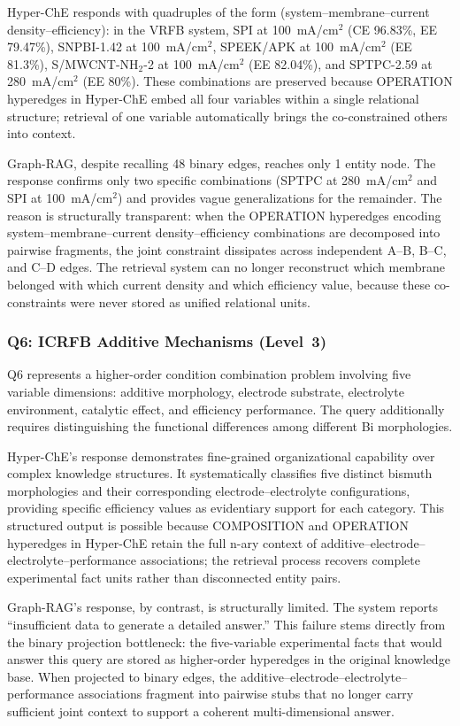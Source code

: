 Hyper-ChE responds with quadruples of the form (system--membrane--current density--efficiency): in the VRFB system, SPI at 100~mA/cm$^2$ (CE 96.83\%, EE 79.47\%), SNPBI-1.42 at 100~mA/cm$^2$, SPEEK/APK at 100~mA/cm$^2$ (EE 81.3\%), S/MWCNT-NH$_2$-2 at 100~mA/cm$^2$ (EE 82.04\%), and SPTPC-2.59 at 280~mA/cm$^2$ (EE 80\%). These combinations are preserved because OPERATION hyperedges in Hyper-ChE embed all four variables within a single relational structure; retrieval of one variable automatically brings the co-constrained others into context.

Graph-RAG, despite recalling 48 binary edges, reaches only 1 entity node. The response confirms only two specific combinations (SPTPC at 280~mA/cm$^2$ and SPI at 100~mA/cm$^2$) and provides vague generalizations for the remainder. The reason is structurally transparent: when the OPERATION hyperedges encoding system--membrane--current density--efficiency combinations are decomposed into pairwise fragments, the joint constraint dissipates across independent A--B, B--C, and C--D edges. The retrieval system can no longer reconstruct which membrane belonged with which current density and which efficiency value, because these co-constraints were never stored as unified relational units.

\subsubsection{Q6: ICRFB Additive Mechanisms (Level~3)}

Q6 represents a higher-order condition combination problem involving five variable dimensions: additive morphology, electrode substrate, electrolyte environment, catalytic effect, and efficiency performance. The query additionally requires distinguishing the functional differences among different Bi morphologies.

Hyper-ChE's response demonstrates fine-grained organizational capability over complex knowledge structures. It systematically classifies five distinct bismuth morphologies and their corresponding electrode--electrolyte configurations, providing specific efficiency values as evidentiary support for each category. This structured output is possible because COMPOSITION and OPERATION hyperedges in Hyper-ChE retain the full n-ary context of additive--electrode--electrolyte--performance associations; the retrieval process recovers complete experimental fact units rather than disconnected entity pairs.

Graph-RAG's response, by contrast, is structurally limited. The system reports ``insufficient data to generate a detailed answer.'' This failure stems directly from the binary projection bottleneck: the five-variable experimental facts that would answer this query are stored as higher-order hyperedges in the original knowledge base. When projected to binary edges, the additive--electrode--electrolyte--performance associations fragment into pairwise stubs that no longer carry sufficient joint context to support a coherent multi-dimensional answer.

